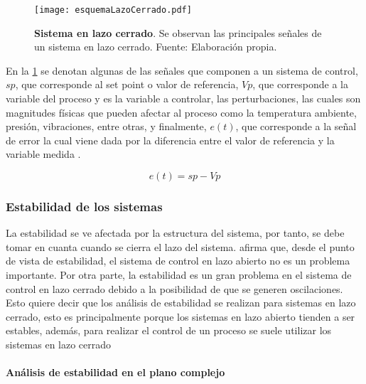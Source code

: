			\begin{figure}[htb]
				\centering
				\texttt{[image: esquemaLazoCerrado.pdf]}
				\caption[Ejemplo de un sistema en lazo cerrado]{\textbf{Sistema en lazo cerrado}. Se observan las principales señales de un sistema en lazo cerrado. Fuente: Elaboración propia.} 
				\label{fig:esquemaLazoCerrado}
			\end{figure}
			
            En la \cref{fig:esquemaLazoCerrado} se denotan algunas de las señales que componen a un sistema de control, $sp$, que corresponde al set point o valor de referencia, $Vp$, que corresponde a la variable del proceso y es la variable a controlar, las perturbaciones, las cuales son magnitudes físicas que pueden afectar al proceso como la temperatura ambiente, presión, vibraciones, entre otras, y finalmente, $e(t)$, que corresponde a la señal de error la cual viene dada por la diferencia entre el valor de referencia y la variable medida \Parencite{maloney2006electronica}.
            
            \begin{equation}\label{eq:Serror}
				e(t) = sp - Vp
            \end{equation}
            
        \subsubsection{Estabilidad de los sistemas}

            La estabilidad se ve afectada por la estructura del sistema, por tanto, se debe tomar en cuanta cuando se cierra el lazo del sistema. \textcite{ogata2003ingenieria} afirma que, desde el punto de vista de estabilidad, el sistema de control en lazo abierto no es un problema importante. Por otra parte, la estabilidad es un gran problema en el sistema de control en lazo cerrado debido a la posibilidad de que se generen oscilaciones. Esto quiere decir que los análisis de estabilidad se realizan para sistemas en lazo cerrado, esto es principalmente porque los sistemas en lazo abierto tienden a ser estables, además, para realizar el control de un proceso se suele utilizar los sistemas en lazo cerrado

            \paragraph{Análisis de estabilidad en el plano complejo}
            
